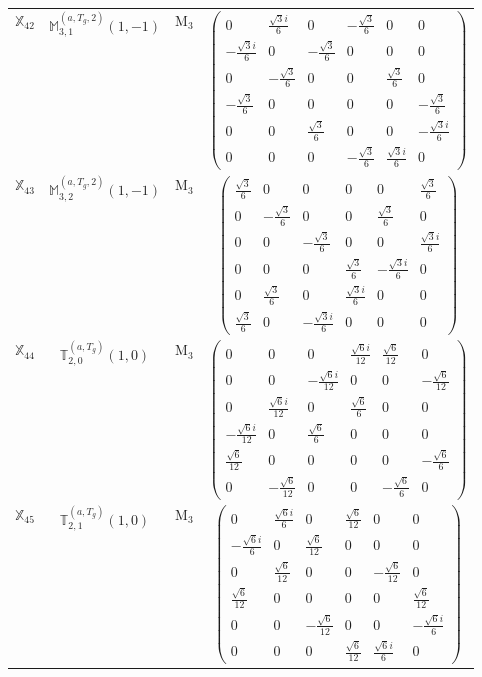 \documentclass[fleqn,10pt,landscape]{article}
\begin{document}
\begin{itemize}
\begin{center}
\begin{longtable}{c|c|c|c}
$ \mathbb{X}_{42} $ & $\mathbb{M}_{3,1}^{(a,T_{g},2)}(1,-1)$ & M$_{3}$ & $\begin{pmatrix} 0 & \frac{\sqrt{3} i}{6} & 0 & - \frac{\sqrt{3}}{6} & 0 & 0 \\ - \frac{\sqrt{3} i}{6} & 0 & - \frac{\sqrt{3}}{6} & 0 & 0 & 0 \\ 0 & - \frac{\sqrt{3}}{6} & 0 & 0 & \frac{\sqrt{3}}{6} & 0 \\ - \frac{\sqrt{3}}{6} & 0 & 0 & 0 & 0 & - \frac{\sqrt{3}}{6} \\ 0 & 0 & \frac{\sqrt{3}}{6} & 0 & 0 & - \frac{\sqrt{3} i}{6} \\ 0 & 0 & 0 & - \frac{\sqrt{3}}{6} & \frac{\sqrt{3} i}{6} & 0 \end{pmatrix}$ \\
$ \mathbb{X}_{43} $ & $\mathbb{M}_{3,2}^{(a,T_{g},2)}(1,-1)$ & M$_{3}$ & $\begin{pmatrix} \frac{\sqrt{3}}{6} & 0 & 0 & 0 & 0 & \frac{\sqrt{3}}{6} \\ 0 & - \frac{\sqrt{3}}{6} & 0 & 0 & \frac{\sqrt{3}}{6} & 0 \\ 0 & 0 & - \frac{\sqrt{3}}{6} & 0 & 0 & \frac{\sqrt{3} i}{6} \\ 0 & 0 & 0 & \frac{\sqrt{3}}{6} & - \frac{\sqrt{3} i}{6} & 0 \\ 0 & \frac{\sqrt{3}}{6} & 0 & \frac{\sqrt{3} i}{6} & 0 & 0 \\ \frac{\sqrt{3}}{6} & 0 & - \frac{\sqrt{3} i}{6} & 0 & 0 & 0 \end{pmatrix}$ \\
$ \mathbb{X}_{44} $ & $\mathbb{T}_{2,0}^{(a,T_{g})}(1,0)$ & M$_{3}$ & $\begin{pmatrix} 0 & 0 & 0 & \frac{\sqrt{6} i}{12} & \frac{\sqrt{6}}{12} & 0 \\ 0 & 0 & - \frac{\sqrt{6} i}{12} & 0 & 0 & - \frac{\sqrt{6}}{12} \\ 0 & \frac{\sqrt{6} i}{12} & 0 & \frac{\sqrt{6}}{6} & 0 & 0 \\ - \frac{\sqrt{6} i}{12} & 0 & \frac{\sqrt{6}}{6} & 0 & 0 & 0 \\ \frac{\sqrt{6}}{12} & 0 & 0 & 0 & 0 & - \frac{\sqrt{6}}{6} \\ 0 & - \frac{\sqrt{6}}{12} & 0 & 0 & - \frac{\sqrt{6}}{6} & 0 \end{pmatrix}$ \\
$ \mathbb{X}_{45} $ & $\mathbb{T}_{2,1}^{(a,T_{g})}(1,0)$ & M$_{3}$ & $\begin{pmatrix} 0 & \frac{\sqrt{6} i}{6} & 0 & \frac{\sqrt{6}}{12} & 0 & 0 \\ - \frac{\sqrt{6} i}{6} & 0 & \frac{\sqrt{6}}{12} & 0 & 0 & 0 \\ 0 & \frac{\sqrt{6}}{12} & 0 & 0 & - \frac{\sqrt{6}}{12} & 0 \\ \frac{\sqrt{6}}{12} & 0 & 0 & 0 & 0 & \frac{\sqrt{6}}{12} \\ 0 & 0 & - \frac{\sqrt{6}}{12} & 0 & 0 & - \frac{\sqrt{6} i}{6} \\ 0 & 0 & 0 & \frac{\sqrt{6}}{12} & \frac{\sqrt{6} i}{6} & 0 \end{pmatrix}$ \\

\end{longtable}
\end{center}
\end{itemize}
\end{document}
